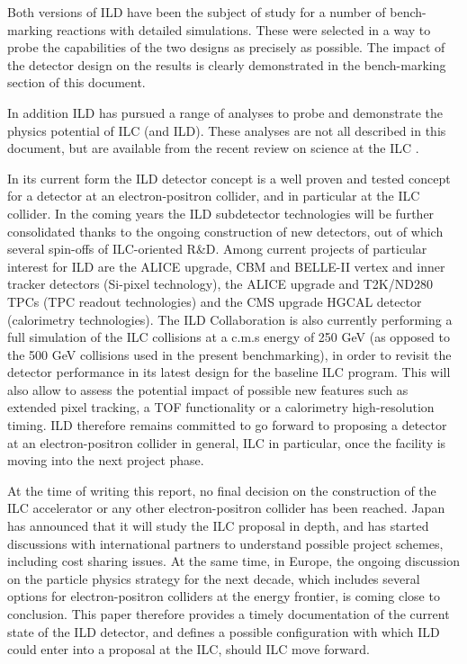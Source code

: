 Both versions of ILD have been the subject of study for a number of bench-marking reactions with detailed simulations. These were selected in a way to probe the capabilities of the two designs as precisely as possible. The impact of the detector design on the results is clearly demonstrated in the bench-marking section of this document. 

In addition ILD has pursued a range of analyses to probe and demonstrate the physics potential of ILC (and ILD). These analyses are not all described in this document, but are available from the recent review on science at the ILC \cite{ild:bib:ref-keisuke}.

In its current form the ILD detector concept is a well proven and tested concept for a detector at an electron-positron collider, and in particular at the ILC collider. 
In the coming years the ILD subdetector technologies will be further consolidated thanks to the ongoing construction of new detectors, out of which several spin-offs of ILC-oriented R\&D. Among current projects of particular interest for ILD are the ALICE upgrade, CBM and BELLE-II vertex and inner tracker detectors (Si-pixel technology), the ALICE upgrade and T2K/ND280 TPCs (TPC readout technologies) and the CMS upgrade HGCAL detector (calorimetry technologies). The ILD Collaboration is also currently performing a full simulation of the ILC collisions at a c.m.s energy of 250 GeV (as opposed to the 500 GeV collisions used in the present benchmarking), in order to revisit the detector performance in its latest design for the baseline ILC program. This will also allow to assess the potential impact of possible new features such as extended pixel tracking, a TOF functionality or a calorimetry high-resolution timing.  
ILD therefore remains committed to go forward to proposing a detector at an electron-positron collider in general, ILC in particular, once the facility is moving into the next project phase. 

At the time of writing this report, no final decision on the construction of the ILC accelerator or any other electron-positron collider has been reached. Japan has announced that it will study the ILC proposal in depth, and has started discussions with international partners to understand possible project schemes, including cost sharing issues. At the same time, in Europe, the ongoing discussion on the particle physics strategy for the next decade, which includes several options for electron-positron colliders at the energy frontier, is coming close to conclusion. 
This paper therefore provides a timely documentation of the current state of the ILD detector, and defines a possible configuration with which ILD could enter into a proposal at the ILC, should ILC move forward. 




